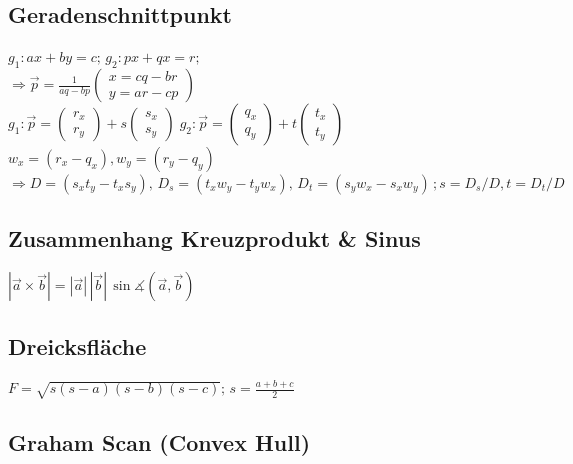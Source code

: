 \documentclass[10pt,a4paper,ngerman,oneside,]{article}
\begin{document}
\begin{multicols}{2}
\subsection{Geradenschnittpunkt}
$g_1: ax+by=c;\,g_2: px+qx=r;$\\
$\Rightarrow \vec{p}=\frac{1}{aq-bp}\begin{pmatrix}
x = cq-br\\y=ar-cp
\end{pmatrix}$\\
$
g_1: \vec{p}=\begin{pmatrix}r_x\\r_y\end{pmatrix}+ s \begin{pmatrix}s_x\\s_y\end{pmatrix}\;
g_2: \vec{p}=\begin{pmatrix}q_x\\q_y\end{pmatrix}+ t \begin{pmatrix}t_x\\t_y\end{pmatrix}$\\ $w_x=(r_x-q_x),  w_y=(r_y-q_y)$\\
$\Rightarrow D=(s_xt_y-t_xs_y),\, D_s=(t_xw_y-t_yw_x),\,
D_t=(s_yw_x-s_xw_y)\,; s=D_s/D, t=D_t/D$

\renewcommand{\tan}{\ensuremath{\operatorname{tan}}}
\renewcommand{\cot}{\ensuremath{\operatorname{cot}}}
\subsection{Zusammenhang Kreuzprodukt \& Sinus}
$|\vec{a}\times\vec{b}|=|\vec{a}| \, | \vec{b} | \, \sin \measuredangle (\vec{a},\vec{b})$
\subsection{Dreicksfläche}
$F=\sqrt{s(s-a)(s-b)(s-c)};\,s=\frac{a+b+c}{2}$

\subsection{Graham Scan (Convex Hull)}

\end{multicols}
\end{document}
